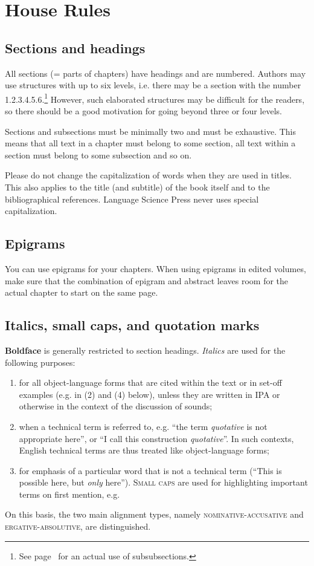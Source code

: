 \section{House Rules}

\subsection{Sections and headings}

All sections (= parts of chapters) have headings and are numbered. Authors may use structures with up to
six levels, i.e. there may be a section with the number 1.2.3.4.5.6.\footnote{
  See page~\pageref{sec-Chinese} for an actual use of subsubsections.%
} However, such elaborated
structures may be difficult for the readers, so there should be a good motivation for going beyond
three or four levels.

Sections and subsections must be minimally two and must be exhaustive. This means that all text in a chapter
must belong to some section, all text within a section must belong to some subsection and so on. 


Please do not change the capitalization of words when they are used in titles. 
This also applies
to the title (and subtitle) of the book itself and to the bibliographical references. Language
Science Press never uses special capitalization.


\subsection{Epigrams}
You can use epigrams for your chapters. When using epigrams in edited volumes, make sure that the combination of epigram and abstract leaves room for the actual chapter to start on the same page.


\subsection{Italics, small caps, and quotation marks}

\textbf{Boldface} is generally restricted to section headings.
\textit{Italics} are used for the following purposes:
\begin{enumerate}
\item for all object-language forms that are cited within the text or in set-off examples (e.g. in (2) and (4) below), unless they are written in IPA or otherwise in the context of the discussion of sounds;
\item  when a technical term is referred to, e.g. ``the term \textit{quotative} is not appropriate here'', or ``I call this construction \textit{quotative}''. In such contexts, English technical terms are thus treated like object-language forms;
\item for emphasis of a particular word that is not a technical term (``This is possible here, but \textit{only} here'').
\textsc{Small caps} are used for highlighting important terms on first mention, e.g.
\end{enumerate}
\ea
On this basis, the two main alignment types, namely \textsc{nominative-accusative} and \textsc{ergative-absolutive}, are distinguished.
\z

